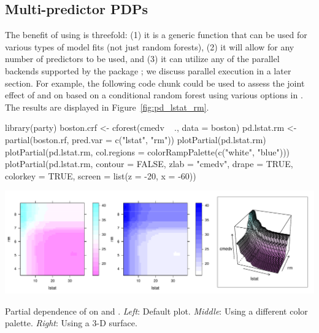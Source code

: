 \subsection{Multi-predictor PDPs}

The benefit of using  is threefold: (1) it is a generic function that can be used for various types of model fits (not just random forests), (2) it will allow for any number of predictors to be used, and (3) it can utilize any of the parallel backends supported by the  package \citep{foreach-pkg}; we discuss parallel execution in a later section. For example, the following code chunk could be used to assess the joint effect of  and  on  based on a conditional random forest using various options in . The results are displayed in Figure~\ref{fig:pd_lstat_rm}.
\begin{example}
library(party)
boston.crf <- cforest(cmedv ~ ., data = boston)
pd.lstat.rm <- partial(boston.rf, pred.var = c("lstat", "rm"))
plotPartial(pd.lstat.rm)
plotPartial(pd.lstat.rm, col.regions = colorRampPalette(c("white", "blue")))
plotPartial(pd.lstat.rm, contour = FALSE, zlab = "cmedv", drape = TRUE, 
            colorkey = TRUE, screen = list(z = -20, x = -60))
\end{example}

\begin{widefigure}[htbp]
  \centering
  \includegraphics[width=1.0\linewidth]{pd_lstat_rm}
  \caption{Partial dependence of  on  and . \textit{Left}: Default plot. \textit{Middle}: Using a different color palette. \textit{Right}: Using a 3-D surface.}
  \label{fig:pd_lstat_rm}
\end{widefigure}



